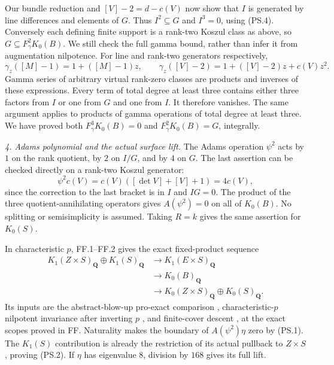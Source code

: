 Our bundle reduction and $[V]-2=d-c(V)$ now show that $I$
is generated by line differences and elements of $G$.
Thus $I^2\subseteq G$ and $I^3=0$, using (PS.4).
Conversely each defining finite support is a rank-two
Koszul class as above, so $G\subseteq F_\gamma^2K_0(B)$.
We still check the full gamma bound, rather than infer it
from augmentation nilpotence. For line and rank-two
generators respectively,
\[
 \gamma_z([M]-1)=1+([M]-1)z,\qquad
 \gamma_z([V]-2)=1+([V]-2)z+c(V)z^2.
\]
Gamma series of arbitrary virtual rank-zero classes are
products and inverses of these expressions. Every term
of total degree at least three contains either three
factors from $I$ or one from $G$ and one from $I$.
It therefore vanishes. The same argument applies to
products of gamma operations of total degree at least
three. We have proved both $F_\gamma^3K_0(B)=0$ and
$F_\gamma^2K_0(B)=G$, integrally.

\emph{4. Adams polynomial and the actual surface lift.}
The Adams operation $\psi^2$ acts by $1$ on the rank quotient,
by $2$ on $I/G$, and by $4$ on $G$. The last assertion can be
checked directly on a rank-two Koszul generator:
\[
 \psi^2c(V)=c(V)([\det V]+[V]+1)=4c(V),
\]
since the correction to the last bracket is in $I$ and
$IG=0$. The product of the three quotient-annihilating
operators gives $A(\psi^2)=0$ on all of $K_0(B)$.
No splitting or semisimplicity is assumed. Taking $R=k$
gives the same assertion for $K_0(S)$.

In characteristic $p$, FF.1--FF.2 gives the exact
fixed-product sequence
\begin{equation}
\begin{split}
 K_1(Z\times S)_{\mathbf Q}\oplus K_1(S)_{\mathbf Q}
 &\longrightarrow K_1(E\times S)_{\mathbf Q}\\
 &\longrightarrow K_0(B)_{\mathbf Q}\\
 &\longrightarrow K_0(Z\times S)_{\mathbf Q}
                         \oplus K_0(S)_{\mathbf Q}.
\end{split}                                               \tag{PS.8}
\end{equation}
Its inputs are the abstract-blow-up pro-exact comparison
\citep[Theorem A and (1.6)]{rootKerzStrunkTamme2018},
characteristic-$p$ nilpotent invariance after inverting $p$
\citep[Theorem A]{rootGeisserHesselholt2011}, and finite-cover
descent \citep[Theorem 8.1]{D_ThomasonTrobaugh1990}, at the
exact scopes proved in FF. Naturality makes the boundary
of $A(\psi^2)\eta$ zero by (PS.1). The $K_1(S)$ contribution
is already the restriction of its actual pullback to
$Z\times S$, proving (PS.2). If $\eta$ has eigenvalue $8$,
division by $168$ gives its full lift.


